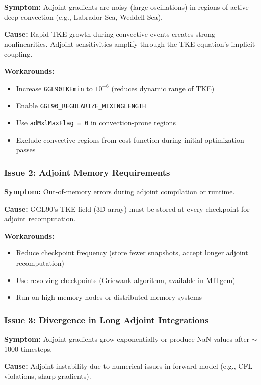 \documentclass[12pt,letterpaper]{article}
\begin{document}
\textbf{Symptom:} Adjoint gradients are noisy (large oscillations) in regions of active deep convection (e.g., Labrador Sea, Weddell Sea).

\textbf{Cause:} Rapid TKE growth during convective events creates strong nonlinearities. Adjoint sensitivities amplify through the TKE equation's implicit coupling.

\textbf{Workarounds:}
\begin{itemize}[leftmargin=*]
  \item Increase \texttt{GGL90TKEmin} to $10^{-6}$ (reduces dynamic range of TKE)
  \item Enable \texttt{GGL90\_REGULARIZE\_MIXINGLENGTH}
  \item Use \texttt{adMxlMaxFlag = 0} in convection-prone regions
  \item Exclude convective regions from cost function during initial optimization passes
\end{itemize}

\subsubsection{Issue 2: Adjoint Memory Requirements}

\textbf{Symptom:} Out-of-memory errors during adjoint compilation or runtime.

\textbf{Cause:} GGL90's TKE field (3D array) must be stored at every checkpoint for adjoint recomputation.

\textbf{Workarounds:}
\begin{itemize}[leftmargin=*]
  \item Reduce checkpoint frequency (store fewer snapshots, accept longer adjoint recomputation)
  \item Use revolving checkpoints (Griewank algorithm, available in MITgcm)
  \item Run on high-memory nodes or distributed-memory systems
\end{itemize}

\subsubsection{Issue 3: Divergence in Long Adjoint Integrations}

\textbf{Symptom:} Adjoint gradients grow exponentially or produce NaN values after $\sim$1000 timesteps.

\textbf{Cause:} Adjoint instability due to numerical issues in forward model (e.g., CFL violations, sharp gradients).
\end{document}
